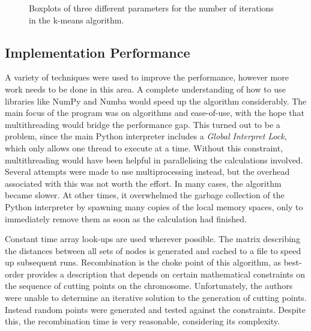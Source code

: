 \documentclass[12pt,twocolumn,oneside]{osajnl}
\begin{document}
\begin{figure}[htbp]
\centering
{}
\caption{Boxplots of three different parameters for the number of iterations in the k-means algorithm.}
\label{fig:kci}
\end{figure}


\subsection{Implementation Performance}
A variety of techniques were used to improve the performance, however more work needs to be done in this area. A complete understanding of how to use libraries like NumPy and Numba would speed up the algorithm considerably. The main focus of the program was on algorithms and ease-of-use, with the hope that multithreading would bridge the performance gap. This turned out to be a problem, since the main Python interpreter includes a \textit{Global Interpret Lock}, which only allows one thread to execute at a time. Without this constraint, multithreading would have been helpful in parallelising the calculations involved. Several attempts were made to use multiprocessing instead, but the overhead associated with this was not worth the effort. In many cases, the algorithm became slower. At other times, it overwhelmed the garbage collection of the Python interpreter by spawning many copies of the local memory spaces, only to immediately remove them as soon as the calculation had finished.

Constant time array look-ups are used wherever possible. The matrix describing the distances between all sets of nodes is generated and cached to a file to speed up subsequent runs. Recombination is the choke point of this algorithm, as best-order provides a description that depends on certain mathematical constraints on the sequence of cutting points on the chromosome. Unfortunately, the authors were unable to determine an iterative solution to the generation of cutting points. Instead random points were generated and tested against the constraints. Despite this, the recombination time is very reasonable, considering its complexity.
\end{document}
